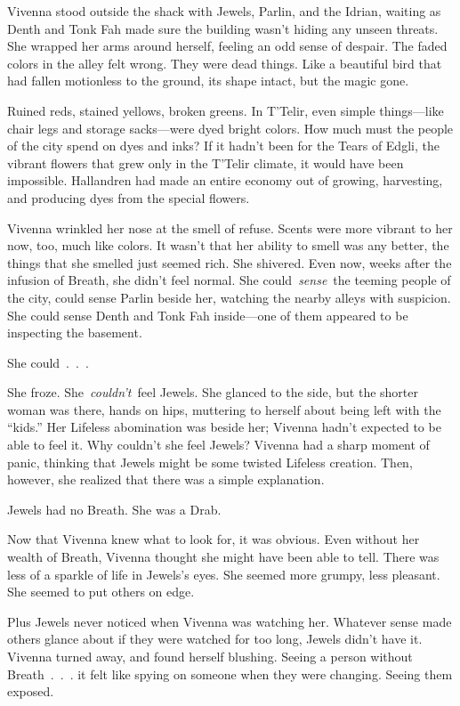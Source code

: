Vivenna stood outside the shack with Jewels, Parlin, and the Idrian, waiting as Denth and Tonk Fah made sure the building wasn’t hiding any unseen threats. She wrapped her arms around herself, feeling an odd sense of despair. The faded colors in the alley felt wrong. They were dead things. Like a beautiful bird that had fallen motionless to the ground, its shape intact, but the magic gone.

Ruined reds, stained yellows, broken greens. In T’Telir, even simple things—like chair legs and storage sacks—were dyed bright colors. How much must the people of the city spend on dyes and inks? If it hadn’t been for the Tears of Edgli, the vibrant flowers that grew only in the T’Telir climate, it would have been impossible. Hallandren had made an entire economy out of growing, harvesting, and producing dyes from the special flowers.

Vivenna wrinkled her nose at the smell of refuse. Scents were more vibrant to her now, too, much like colors. It wasn’t that her ability to smell was any better, the things that she smelled just seemed rich. She shivered. Even now, weeks after the infusion of Breath, she didn’t feel normal. She could~\textit{sense}~the teeming people of the city, could sense Parlin beside her, watching the nearby alleys with suspicion. She could sense Denth and Tonk Fah inside—one of them appeared to be inspecting the basement.

She could~.~.~.

She froze. She~\textit{couldn’t}~feel Jewels. She glanced to the side, but the shorter woman was there, hands on hips, muttering to herself about being left with the “kids.” Her Lifeless abomination was beside her; Vivenna hadn’t expected to be able to feel it. Why couldn’t she feel Jewels? Vivenna had a sharp moment of panic, thinking that Jewels might be some twisted Lifeless creation. Then, however, she realized that there was a simple explanation.

Jewels had no Breath. She was a Drab.

Now that Vivenna knew what to look for, it was obvious. Even without her wealth of Breath, Vivenna thought she might have been able to tell. There was less of a sparkle of life in Jewels’s eyes. She seemed more grumpy, less pleasant. She seemed to put others on edge.

Plus Jewels never noticed when Vivenna was watching her. Whatever sense made others glance about if they were watched for too long, Jewels didn’t have it. Vivenna turned away, and found herself blushing. Seeing a person without Breath~.~.~. it felt like spying on someone when they were changing. Seeing them exposed.

